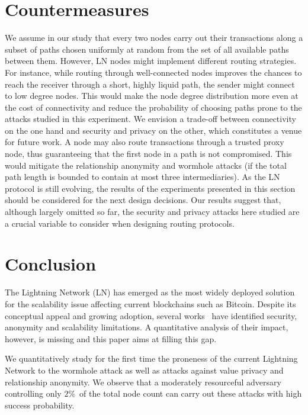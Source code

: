 \section{Countermeasures}
We assume in our study that every two nodes carry out their transactions along a subset of paths chosen uniformly at random from the set of all available paths between them.
However, LN nodes might implement different routing strategies.
For instance, while routing through well-connected nodes improves the chances to reach the receiver through a short, highly liquid path, the sender might connect to low degree nodes.
This would make the node degree distribution more even at the cost of connectivity and reduce the probability of choosing paths prone to the attacks studied in this experiment.
We envision a trade-off between connectivity on the one hand and security and privacy on the other, which constitutes a venue for future work.
A node may also route transactions through a trusted proxy node, thus guaranteeing that the first node in a path is not compromised.
This would mitigate the relationship anonymity and wormhole attacks (if the total path length is bounded to contain at most three intermediaries).
As the LN protocol is still evolving, the results of the experiments presented in this section should be considered for the next design decisions.
Our results suggest that, although largely omitted so far, the security and privacy attacks here studied are a crucial variable to consider when designing routing protocols.


\section{Conclusion}
\label{sec:conclusions}

The Lightning Network (LN) has emerged as the most widely deployed solution for the scalability issue affecting current blockchains such as Bitcoin.
Despite its conceptual appeal and growing adoption, several works~\cite{Malavolta2017, Malavolta2019} have identified security, anonymity and scalability limitations.
A quantitative analysis of their impact, however, is missing and this paper aims at filling this gap.

We quantitatively study for the first time the proneness of the current Lightning Network to the wormhole attack as well as attacks against value privacy and relationship anonymity.
We observe that a moderately resourceful adversary controlling only $2\%$~of the total node count can carry out these attacks with high success probability.
